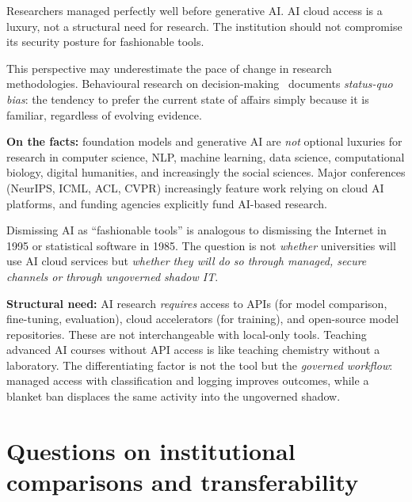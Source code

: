 \bigskip

\begin{clarificationbox}
Researchers managed perfectly well before generative AI. AI cloud access is a luxury, not a structural need for research. The institution should not compromise its security posture for fashionable tools.
\end{clarificationbox}

\begin{answerbox}[Answer to Q4.3]
This perspective may underestimate the pace of change in research methodologies. Behavioural research on decision-making~\cite{samuelson-zeckhauser} documents \emph{status-quo bias}: the tendency to prefer the current state of affairs simply because it is familiar, regardless of evolving evidence.

\medskip\noindent\textbf{On the facts:} foundation models and generative AI are \emph{not} optional luxuries for research in computer science, NLP, machine learning, data science, computational biology, digital humanities, and increasingly the social sciences. Major conferences (NeurIPS, ICML, ACL, CVPR) increasingly feature work relying on cloud AI platforms, and funding agencies explicitly fund AI-based research.

\medskip\noindent Dismissing AI as ``fashionable tools'' is analogous to dismissing the Internet in 1995 or statistical software in 1985. The question is not \emph{whether} universities will use AI cloud services but \emph{whether they will do so through managed, secure channels or through ungoverned shadow IT}.

\medskip\noindent\textbf{Structural need:} AI research \emph{requires} access to APIs (for model comparison, fine-tuning, evaluation), cloud accelerators (for training), and open-source model repositories. These are not interchangeable with local-only tools. Teaching advanced AI courses without API access is like teaching chemistry without a laboratory. The differentiating factor is not the tool but the \emph{governed workflow}: managed access with classification and logging improves outcomes, while a blanket ban displaces the same activity into the ungoverned shadow.
\end{answerbox}

\section{Questions on institutional comparisons and transferability}
\label{sec:q-comparisons}

